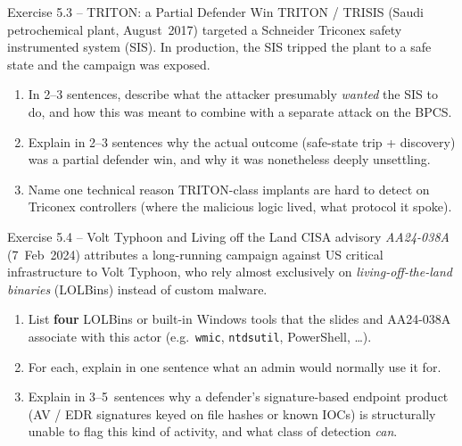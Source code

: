 \documentclass[11pt,a4paper]{article}
\begin{document}
\begin{taskbox}{Exercise 5.3 -- TRITON: a Partial Defender Win}
TRITON / TRISIS (Saudi petrochemical plant, August~2017) targeted a Schneider Triconex safety
instrumented system (SIS). In production, the SIS tripped the plant to a safe state and the
campaign was exposed.
\begin{enumerate}\setlength{\itemsep}{0pt}
  \item In 2--3 sentences, describe what the attacker presumably \emph{wanted} the
        SIS to do, and how this was meant to combine with a separate attack on the BPCS.
  \item Explain in 2--3 sentences why the actual outcome (safe-state trip + discovery)
        was a partial defender win, and why it was nonetheless deeply unsettling.
  \item Name one technical reason TRITON-class implants are hard to detect on
        Triconex controllers (where the malicious logic lived, what protocol it spoke).
\end{enumerate}
\end{taskbox}

\begin{taskbox}{Exercise 5.4 -- Volt Typhoon and Living off the Land}
CISA advisory \emph{AA24-038A} (7~Feb~2024) attributes a long-running campaign against US critical
infrastructure to Volt Typhoon, who rely almost exclusively on \emph{living-off-the-land binaries}
(LOLBins) instead of custom malware.
\begin{enumerate}\setlength{\itemsep}{0pt}
  \item List \textbf{four} LOLBins or built-in Windows tools that the slides and AA24-038A
        associate with this actor (e.g.\ \texttt{wmic}, \texttt{ntdsutil}, PowerShell, \ldots).
  \item For each, explain in one sentence what an admin would normally use it for.
  \item Explain in 3--5~sentences why a defender's signature-based endpoint product (AV / EDR
        signatures keyed on file hashes or known IOCs) is structurally unable to flag this kind
        of activity, and what class of detection \emph{can}.
\end{enumerate}
\end{taskbox}
\end{document}

